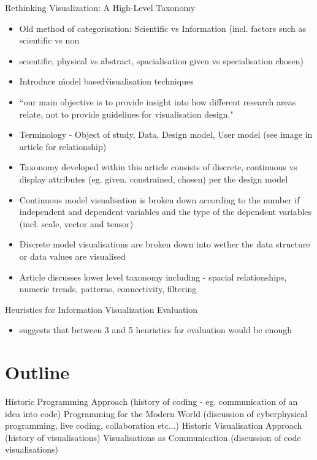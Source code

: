 Rethinking Visualization: A High-Level Taxonomy
\begin{itemize}
\item Old method of categorisation: Scientific vs Information (incl. factors such as scientific vs non\item scientific, physical vs abstract, spacialisation given vs specialisation chosen)
\item Introduce \'model based\' visualisation techniques
\item “our main objective is to provide insight into how different research areas relate, not to provide guidelines for visualisation design."
\item Terminology - Object of study, Data, Design model, User model (see image in article for relationship)
\item Taxonomy developed within this article consists of {discrete, continuous} vs display attributes (eg. given, constrained, chosen) per the design model
\item Continuous model visualisation is broken down according to the number if independent and dependent variables and the type of the dependent variables (incl. scale, vector and tensor)
\item Discrete model visualisations are broken down into wether the data structure or data values are visualised

\item Article discusses lower level taxonomy including - spacial relationships, numeric trends, patterns, connectivity, filtering
\end{itemize}

Heuristics for Information Visualization Evaluation
\begin{itemize}
\item suggests that between 3 and 5 heuristics for evaluation would be enough
\end{itemize}









\section{Outline}
\label{sec:outline}
Historic Programming Approach (history of coding - eg. communication of an idea into code)
Programming for the Modern World (discussion of cyberphysical programming, live coding, collaboration etc...)
Historic Visualisation Approach (history of visualisations)
Visualisations as Communication (discussion of code visualisations)












